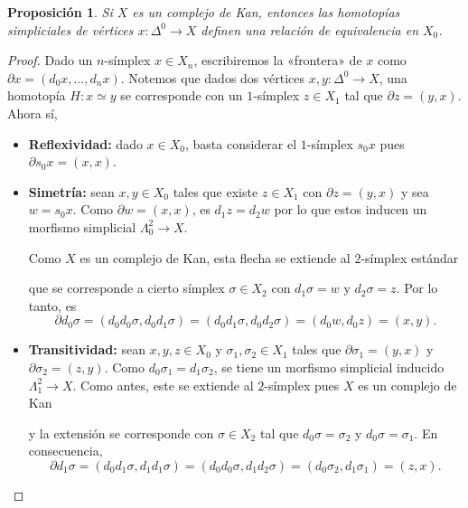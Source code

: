 \documentclass[11pt]{report}
\theoremstyle{colored}
\newtheorem{proposition}{Proposición}[section]
\renewcommand{\ss}[1]{\Delta^{#1}}
\newcommand{\horn}[2]{\Lambda^{#1}_{#2}}
\newcommand{\guill}[1]{«#1»}
\begin{document}
\begin{proposition} Si $X$ es un complejo de Kan, entonces las homotopías simpliciales de vértices $x : \ss{0} \to X$ definen una relación de equivalencia en $X_0$.
\end{proposition}
\begin{proof} Dado un $n$-símplex $x \in X_n$, escribiremos la \guill{frontera} de $x$ como $\partial x = (d_0x,\dots,d_nx)$. Notemos que dados dos vértices $x,y : \ss{0} \to  X$, una homotopía $H : x \simeq y$ se corresponde con un $1$-símplex $z \in X_1$ tal que $\partial z = (y,x)$. Ahora sí, 
\begin{itemize}
\item \textbf{Reflexividad:} dado $x \in X_0$, basta considerar el $1$-símplex $s_0x$ pues $\partial s_0x = (x,x)$.
\item \textbf{Simetría:} sean $x,y \in X_0$ tales que existe $z \in X_1$ con $\partial z = (y,x)$ y sea $w = s_0x$. Como $\partial w = (x,x)$, es $d_1z = d_2w$ por lo que estos inducen un morfismo simplicial $\horn{2}{0} \to X$. 

Como $X$ es un complejo de Kan, esta flecha se extiende al $2$-símplex estándar 
\begin{center}
\end{center}
que se corresponde a cierto símplex $\sigma \in X_2$ con $d_1\sigma = w$ y $d_2\sigma = z$. Por lo tanto, es
\[
\partial d_0\sigma = (d_0d_0\sigma,d_0d_1\sigma) = (d_0d_1\sigma,d_0d_2\sigma) = (d_0w,d_0z) = (x,y).
\]
\item \textbf{Transitividad:} sean $x,y,z \in X_0$ y $\sigma_1,\sigma_2 \in X_1$ tales que $\partial \sigma_1 = (y,x)$ y $\partial \sigma_2 = (z,y)$. Como $d_0\sigma_1 = d_1\sigma_2$, se tiene un morfismo simplicial inducido $\horn{2}{1} \to X$. Como antes, este se extiende al $2$-símplex pues $X$ es un complejo de Kan
\begin{center}
\end{center}
y la extensión se corresponde con $\sigma \in X_2$ tal que $d_0\sigma = \sigma_2$ y $d_0\sigma = \sigma_1$. En consecuencia,
\[
\partial d_1\sigma = (d_0d_1\sigma,d_1d_1\sigma) = (d_0d_0\sigma,d_1d_2\sigma) = (d_0\sigma_2,d_1\sigma_1) = (z,x).
\]
\end{itemize}
\end{proof}
\end{document}
